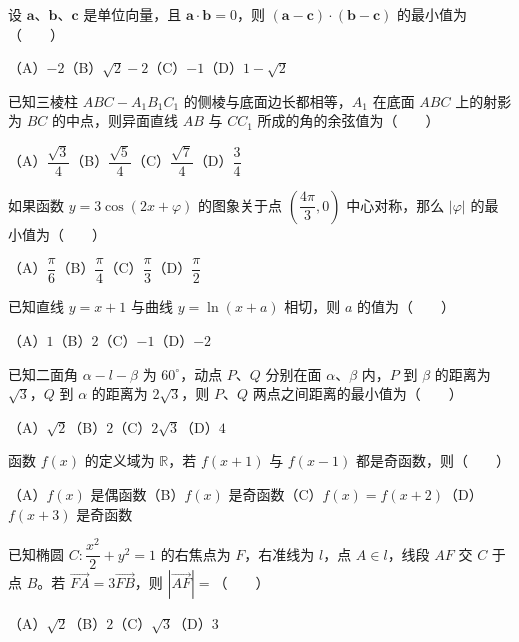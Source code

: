 \begin{question}
设 $\boldsymbol a\text{、}\boldsymbol b\text{、}\boldsymbol c$ 是单位向量，且 $\boldsymbol a\cdot\boldsymbol b=0$，则 $(\boldsymbol a-\boldsymbol c)\cdot(\boldsymbol b-\boldsymbol c)$ 的最小值为\mbox{（　　）}

（A）$-2$\quad（B）$\sqrt2-2$\quad（C）$-1$\quad（D）$1-\sqrt2$

\end{question}
\begin{question}
已知三棱柱 $ABC-A_1B_1C_1$ 的侧棱与底面边长都相等，$A_1$ 在底面 $ABC$ 上的射影为 $BC$ 的中点，则异面直线 $AB$ 与 $CC_1$ 所成的角的余弦值为\mbox{（　　）}

（A）$\dfrac{\sqrt3}{4}$\quad（B）$\dfrac{\sqrt5}{4}$\quad（C）$\dfrac{\sqrt7}{4}$\quad（D）$\dfrac34$

\end{question}
\begin{question}
如果函数 $y=3\cos(2x+\varphi)$ 的图象关于点 $\left(\dfrac{4\pi}{3},0\right)$ 中心对称，那么 $|\varphi|$ 的最小值为\mbox{（　　）}

（A）$\dfrac\pi6$\quad（B）$\dfrac\pi4$\quad（C）$\dfrac\pi3$\quad（D）$\dfrac\pi2$

\end{question}
\begin{question}
已知直线 $y=x+1$ 与曲线 $y=\ln(x+a)$ 相切，则 $a$ 的值为\mbox{（　　）}

（A）$1$\quad（B）$2$\quad（C）$-1$\quad（D）$-2$

\end{question}
\begin{question}
已知二面角 $\alpha-l-\beta$ 为 $60^\circ$，动点 $P\text{、}Q$ 分别在面 $\alpha\text{、}\beta$ 内，$P$ 到 $\beta$ 的距离为 $\sqrt3$，$Q$ 到 $\alpha$ 的距离为 $2\sqrt3$，则 $P\text{、}Q$ 两点之间距离的最小值为\mbox{（　　）}

（A）$\sqrt2$\quad（B）$2$\quad（C）$2\sqrt3$\quad（D）$4$

\end{question}
\begin{question}
函数 $f(x)$ 的定义域为 $\mathbb R$，若 $f(x+1)$ 与 $f(x-1)$ 都是奇函数，则\mbox{（　　）}

（A）$f(x)$ 是偶函数\quad（B）$f(x)$ 是奇函数\quad（C）$f(x)=f(x+2)$\quad（D）$f(x+3)$ 是奇函数

\end{question}
\begin{question}
已知椭圆 $C:\dfrac{x^2}{2}+y^2=1$ 的右焦点为 $F$，右准线为 $l$，点 $A\in l$，线段 $AF$ 交 $C$ 于点 $B$。若 $\overrightarrow{FA}=3\overrightarrow{FB}$，则 $|\overrightarrow{AF}|=$\mbox{（　　）}

（A）$\sqrt2$\quad（B）$2$\quad（C）$\sqrt3$\quad（D）$3$

\end{question}

